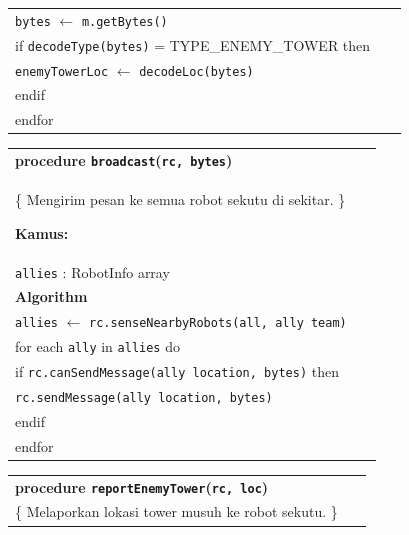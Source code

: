 \documentclass{article}
\newenvironment{pseudobox}
{
\centering
\begin{longtable}{|p{0.94\linewidth}|}
\hline
}
{
\\ \hline
\end{longtable}
\vspace{0.05cm}
}
\begin{document}
\begin{enumerate}[label=\alph*.]
\begin{pseudobox}
\hspace*{3em}\texttt{bytes} $\leftarrow$ \texttt{m.getBytes()} \\

\hspace*{3em}if \texttt{decodeType(bytes)} = TYPE\_ENEMY\_TOWER then \\
\hspace*{4.5em}\texttt{enemyTowerLoc} $\leftarrow$ \texttt{decodeLoc(bytes)} \\
\hspace*{3em}endif \\

\hspace*{1.5em}endfor
\end{pseudobox}

\begin{pseudobox}
\textbf{procedure \texttt{broadcast}(\texttt{rc, bytes})} \\
\{ Mengirim pesan ke semua robot sekutu di sekitar. \}

\textbf{Kamus:} \\
\hspace*{1.5em}\texttt{allies} : RobotInfo array \\

\textbf{Algorithm} \\

\hspace*{1.5em}\texttt{allies} $\leftarrow$ \texttt{rc.senseNearbyRobots(all, ally team)} \\

\hspace*{1.5em}for each \texttt{ally} in \texttt{allies} do \\

\hspace*{3em}if \texttt{rc.canSendMessage(ally location, bytes)} then \\
\hspace*{4.5em}\texttt{rc.sendMessage(ally location, bytes)} \\
\hspace*{3em}endif \\

\hspace*{1.5em}endfor
    
\end{pseudobox}

\begin{pseudobox}
\textbf{procedure \texttt{reportEnemyTower}(\texttt{rc, loc})} \\
\{ Melaporkan lokasi tower musuh ke robot sekutu. \}


\end{pseudobox}
\end{enumerate}
\end{document}
